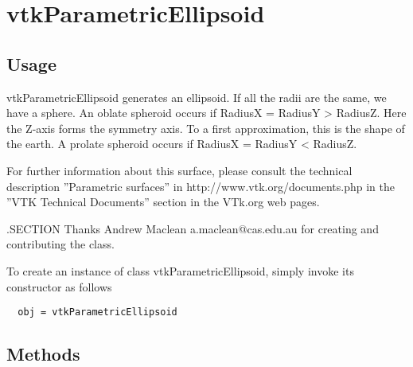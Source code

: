\section{vtkParametricEllipsoid}

\subsection{Usage}

 vtkParametricEllipsoid generates an ellipsoid.
 If all the radii are the same, we have a sphere.
 An oblate spheroid occurs if RadiusX = RadiusY > RadiusZ. 
 Here the Z-axis forms the symmetry axis. To a first
 approximation, this is the shape of the earth.
 A prolate spheroid occurs if RadiusX = RadiusY < RadiusZ.

 For further information about this surface, please consult the 
 technical description ''Parametric surfaces'' in http://www.vtk.org/documents.php 
 in the ''VTK Technical Documents'' section in the VTk.org web pages.

 .SECTION Thanks
 Andrew Maclean a.maclean@cas.edu.au for creating and contributing the
 class.


To create an instance of class vtkParametricEllipsoid, simply
invoke its constructor as follows
\begin{verbatim}
  obj = vtkParametricEllipsoid
\end{verbatim}
\subsection{Methods}


